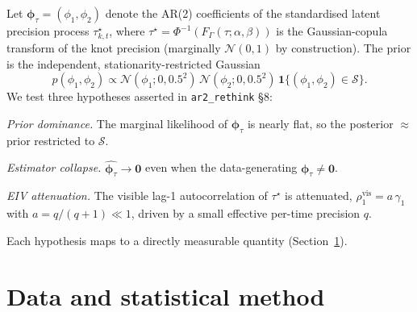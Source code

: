 \documentclass[11pt]{article}
\theoremstyle{definition}
\newcommand{\Norm}{\mathcal{N}}
\newcommand{\Stab}{\mathcal{S}}
\newcommand{\phitau}{\bm{\phi}_\tau}
\newcommand{\code}[1]{\texttt{#1}}
\begin{document}
Let $\phitau=(\phi_1,\phi_2)$ denote the AR(2) coefficients of the standardised
latent precision process $\tau^\star_{k,t}$, where
$\tau^\star = \Phi^{-1}(F_{\Gamma}(\tau;\alpha,\beta))$ is the Gaussian-copula
transform of the knot precision (marginally $\Norm(0,1)$ by construction). The
prior is the independent, stationarity-restricted Gaussian
\begin{equation}
p(\phi_1,\phi_2)\propto \Norm(\phi_1;0,0.5^2)\,\Norm(\phi_2;0,0.5^2)\,
\mathbf 1\{(\phi_1,\phi_2)\in\Stab\}.
\label{eq:prior}
\end{equation}
We test three hypotheses asserted in \code{ar2\_rethink} \S8:
\begin{description}[leftmargin=3.2em, itemsep=2pt]
  \item[\textnormal{(H1)}] \emph{Prior dominance.} The marginal likelihood of
        $\phitau$ is nearly flat, so the posterior $\approx$ prior restricted to
        $\Stab$.
  \item[\textnormal{(H2)}] \emph{Estimator collapse.} $\hat{\phitau}\to\bm 0$
        even when the data-generating $\phitau\neq\bm 0$.
  \item[\textnormal{(H3)}] \emph{EIV attenuation.} The visible lag-1
        autocorrelation of $\tau^\star$ is attenuated,
        $\rho_1^{\text{vis}}=a\,\gamma_1$ with $a=q/(q+1)\ll 1$, driven by a small
        effective per-time precision $q$.
\end{description}
Each hypothesis maps to a directly measurable quantity
(Section~\ref{sec:method}).

\section{Data and statistical method}
\label{sec:method}
\end{document}
